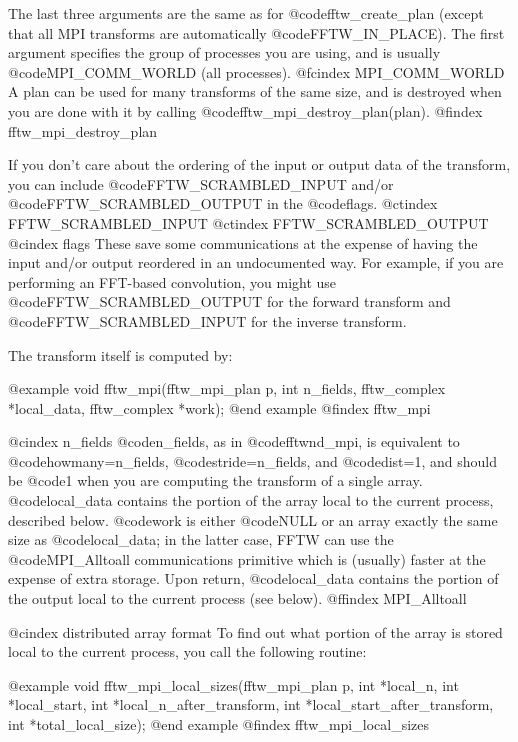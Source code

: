 The last three arguments are the same as for @code{fftw_create_plan}
(except that all MPI transforms are automatically @code{FFTW_IN_PLACE}).
The first argument specifies the group of processes you are using, and
is usually @code{MPI_COMM_WORLD} (all processes).
@fcindex MPI_COMM_WORLD
A plan can be used for many transforms of the same size, and is
destroyed when you are done with it by calling
@code{fftw_mpi_destroy_plan(plan)}.
@findex fftw_mpi_destroy_plan

If you don't care about the ordering of the input or output data of the
transform, you can include @code{FFTW_SCRAMBLED_INPUT} and/or
@code{FFTW_SCRAMBLED_OUTPUT} in the @code{flags}.
@ctindex FFTW_SCRAMBLED_INPUT
@ctindex FFTW_SCRAMBLED_OUTPUT
@cindex flags
These save some communications at the expense of having the input and/or
output reordered in an undocumented way.  For example, if you are
performing an FFT-based convolution, you might use
@code{FFTW_SCRAMBLED_OUTPUT} for the forward transform and
@code{FFTW_SCRAMBLED_INPUT} for the inverse transform.

The transform itself is computed by:

@example
void fftw_mpi(fftw_mpi_plan p, int n_fields,
              fftw_complex *local_data, fftw_complex *work);
@end example
@findex fftw_mpi

@cindex n_fields
@code{n_fields}, as in @code{fftwnd_mpi}, is equivalent to
@code{howmany=n_fields}, @code{stride=n_fields}, and @code{dist=1}, and
should be @code{1} when you are computing the transform of a single
array.  @code{local_data} contains the portion of the array local to the
current process, described below.  @code{work} is either @code{NULL} or
an array exactly the same size as @code{local_data}; in the latter case,
FFTW can use the @code{MPI_Alltoall} communications primitive which is
(usually) faster at the expense of extra storage.  Upon return,
@code{local_data} contains the portion of the output local to the
current process (see below).
@ffindex MPI_Alltoall

@cindex distributed array format
To find out what portion of the array is stored local to the current
process, you call the following routine:

@example
void fftw_mpi_local_sizes(fftw_mpi_plan p,
                          int *local_n, int *local_start,
                          int *local_n_after_transform,
                          int *local_start_after_transform,
                          int *total_local_size);
@end example
@findex fftw_mpi_local_sizes

